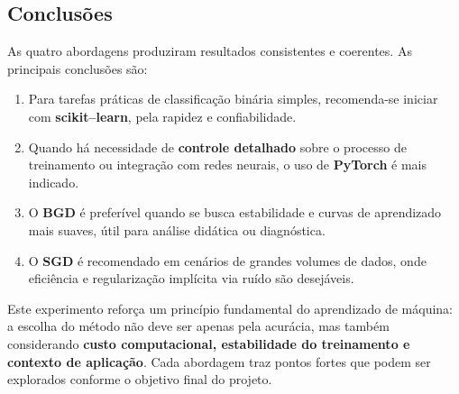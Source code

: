 \documentclass[a4paper]{article}
\begin{document}
\begin{answer}[Ítem 1.2]
\subsection*{Conclusões}
As quatro abordagens produziram resultados consistentes e coerentes. As principais conclusões são:
\begin{enumerate}
    \item Para tarefas práticas de classificação binária simples, recomenda-se iniciar com \textbf{scikit--learn}, pela rapidez e confiabilidade.
    \item Quando há necessidade de \textbf{controle detalhado} sobre o processo de treinamento ou integração com redes neurais, o uso de \textbf{PyTorch} é mais indicado.
    \item O \textbf{BGD} é preferível quando se busca estabilidade e curvas de aprendizado mais suaves, útil para análise didática ou diagnóstica.
    \item O \textbf{SGD} é recomendado em cenários de grandes volumes de dados, onde eficiência e regularização implícita via ruído são desejáveis.
\end{enumerate}

Este experimento reforça um princípio fundamental do aprendizado de máquina: a escolha do método não deve ser apenas pela acurácia, mas também considerando \textbf{custo computacional, estabilidade do treinamento e contexto de aplicação}. 
Cada abordagem traz pontos fortes que podem ser explorados conforme o objetivo final do projeto.

    \end{answer}
\end{document}
